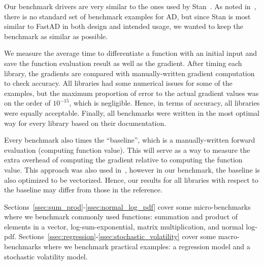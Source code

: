 Our benchmark drivers are very similar to the ones used by Stan~\cite{carpenter:2015}.
As noted in~\cite{margossian:2018}, there is no standard set of benchmark examples for AD,
but since Stan is most similar to FastAD in both design and intended usage,
we wanted to keep the benchmark as similar as possible.

We measure the average time to differentiate a function
with an initial input and 
save the function evaluation result as well as the gradient.
After timing each library, the gradients are compared with manually-written gradient computation to check accuracy.
All libraries had some numerical issues for some of the examples,
but the maximum proportion of error to the actual gradient values was on the order of $ 10^{-15}$, which is negligible.
Hence, in terms of accuracy, all libraries were equally acceptable.
Finally, all benchmarks were written in the most optimal way for every library based on their documentation.

Every benchmark also times the ``baseline'', 
which is a manually-written forward evaluation (computing function value).
This will serve as a way to measure the extra overhead of computing the gradient relative to computing the function value.
This approach was also used in~\cite{carpenter:2015},
however in our benchmark, the baseline is also optimized to be vectorized.
Hence, our results for all libraries with respect to the baseline may differ from those in the reference.

Sections~\ref{ssec:sum_prod}-\ref{ssec:normal_log_pdf} 
cover some micro-benchmarks where we benchmark commonly used functions: 
summation and product of elements in a vector, 
log-sum-exponential, 
matrix multiplication, 
and normal log-pdf.
Sections~\ref{ssec:regression}-\ref{ssec:stochastic_volatility} 
cover some macro-benchmarks where we benchmark practical examples: 
a regression model and a stochastic volatility model.












